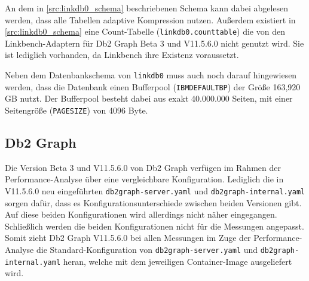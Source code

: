 An dem in \autoref{src:linkdb0_schema} beschriebenen Schema kann dabei abgelesen werden, dass alle Tabellen adaptive Kompression nutzen. Außerdem existiert in \autoref{src:linkdb0_schema} eine Count-Tabelle (\texttt{linkdb0.counttable}) die von den Linkbench-Adaptern für Db2 Graph Beta 3 und V11.5.6.0 nicht genutzt wird. Sie ist lediglich vorhanden, da Linkbench ihre Existenz voraussetzt. 

Neben dem Datenbankschema von \texttt{linkdb0} muss auch noch darauf hingewiesen werden, dass die Datenbank einen Bufferpool (\texttt{IBMDEFAULTBP}) der Größe 163,920 GB nutzt. Der Bufferpool besteht dabei aus exakt 40.000.000 Seiten, mit einer Seitengröße (\texttt{PAGESIZE}) von 4096 Byte.

\subsection{Db2 Graph}
Die Version Beta 3 und V11.5.6.0 von Db2 Graph verfügen im Rahmen der Performance-Analyse über eine vergleichbare Konfiguration. Lediglich die in V11.5.6.0 neu eingeführten \texttt{db2graph-server.yaml} und \texttt{db2graph-internal.ya\allowbreak ml} sorgen dafür, dass es Konfigurationsunterschiede zwischen beiden Versionen gibt. Auf diese beiden Konfigurationen wird allerdings nicht näher eingegangen. Schließlich werden die beiden Konfigurationen nicht für die Messungen angepasst. Somit zieht Db2 Graph V11.5.6.0 bei allen Messungen im Zuge der Performance-Analyse die Standard-Konfiguration von \texttt{db2graph-server.yaml} und \texttt{db2graph-internal.yaml} heran, welche mit dem jeweiligen Container-Image ausgeliefert wird.

